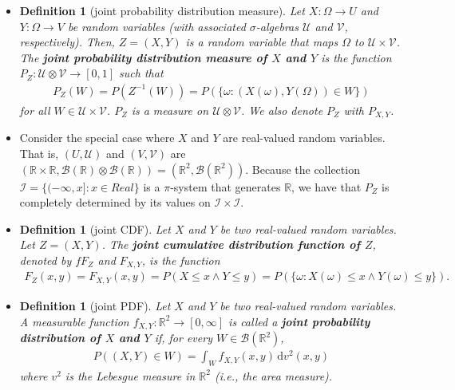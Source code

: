 \documentclass[10pt]{article}
\newtheorem{definition}[lemma]{Definition}
\numberwithin{lemma}{section}
\newcommand{\dee}{\mathrm{d}}
\newcommand{\mcal}[1]{\mathcal{#1}}
\newcommand{\Real}{\mathbb{R}}
\begin{document}
\begin{itemize}
  \item \begin{definition}[joint probability distribution measure]
    Let $X: \Omega \rightarrow U$ and $Y: \Omega \rightarrow V$ be random variables (with associated $\sigma$-algebras $\mcal{U}$ and $\mcal{V}$, respectively). Then, $Z = (X,Y)$ is a random variable that maps $\Omega$ to $\mcal{U} \times \mcal{V}$. The {\bf joint probability distribution measure of $X$ and $Y$} is the function $P_Z: \mcal{U} \otimes \mcal{V} \rightarrow [0,1]$ such that
    \begin{align*}
      P_Z(W) = P(Z^{-1}(W)) = P(\{ \omega : (X(\omega), Y(\Omega)) \in W \})
    \end{align*} 
    for all $W \in \mcal{U} \times \mcal{V}$. $P_Z$ is a measure on $\mcal{U} \otimes \mcal{V}$. We also denote $P_Z$ with $P_{X,Y}$. 
  \end{definition}
 
  \item Consider the special case where $X$ and $Y$ are real-valued random variables. That is, $(U,\mcal{U})$ and $(V,\mcal{V})$  are $(\Real \times \Real, \mcal{B}(\Real) \otimes \mcal{B}(\Real)) = (\Real^2, \mcal{B}(\Real^2))$. Because the collection $\mcal{I} =\{(-\infty, x] : x \in Real \}$ is a $\pi$-system that generates $\Real$, we have that $P_Z$ is completely determined by its values on $\mcal{I} \times \mcal{I}$.
  
  \item \begin{definition}[joint CDF]
    Let $X$ and $Y$ be two real-valued random variables. Let $Z = (X,Y)$. The {\bf joint cumulative distribution function of $Z$}, denoted by $fF_Z$ and $F_{X,Y}$, is the function
    \begin{align*}
      F_Z(x,y) = F_{X,Y}(x, y) = P(X \leq x \wedge Y \leq y) = P(\{ \omega: X(\omega) \leq x \wedge Y(\omega) \leq y \}).
    \end{align*} 
  \end{definition}

  \item \begin{definition}[joint PDF]
    Let $X$ and $Y$ be two real-valued random variables. A measurable function $f_{X,Y}: \Real^2 \rightarrow [0,\infty]$ is called a {\bf joint probability distribution of $X$ and $Y$} if, for every $W \in \mcal{B}(\Real^2)$, 
    \begin{align*}
      P((X,Y) \in W) = \int_W f_{X,Y}(x,y)\, \dee v^2(x,y) 
    \end{align*}
    where $v^2$ is the Lebesgue measure in $\Real^2$ (i.e., the area measure).
  \end{definition}


\end{itemize}
\end{document}
